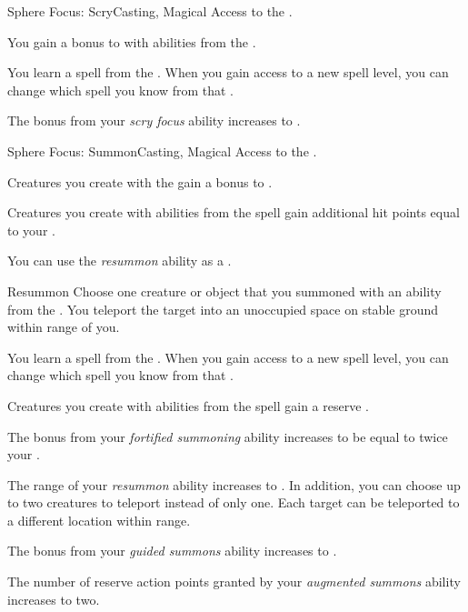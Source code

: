     \begin{feat}{Sphere Focus: Scry}{Casting, Magical}
        \featpre Access to the  .

         You gain a  bonus to  with abilities from the  .

         You learn a spell from the  .
        When you gain access to a new spell level, you can change which spell you know from that .

         The bonus from your \textit{scry focus} ability increases to .
    \end{feat}

    \begin{feat}{Sphere Focus: Summon}{Casting, Magical}
        \featpre Access to the  .

         Creatures you create with the   gain a  bonus to .

         Creatures you create with abilities from the  spell gain additional hit points equal to your .

         You can use the \textit{resummon} ability as a .
        \begin{freeability}{Resummon}
            Choose one creature or object that you summoned with an ability from the  .
            You teleport the target into an unoccupied space on stable ground within \rngmed range of you.
        \end{freeability}

         You learn a spell from the  .
        When you gain access to a new spell level, you can change which spell you know from that .

         Creatures you create with abilities from the  spell gain a reserve .

         The bonus from your \textit{fortified summoning} ability increases to be equal to twice your .

         The range of your \textit{resummon} ability increases to \rnglong.
        In addition, you can choose up to two creatures to teleport instead of only one.
        Each target can be teleported to a different location within range.

         The bonus from your \textit{guided summons} ability increases to .

         The number of reserve action points granted by your \textit{augmented summons} ability increases to two.
    \end{feat}

